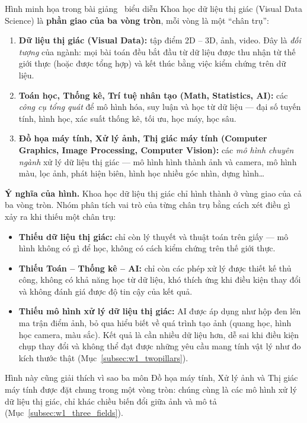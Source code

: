 Hình minh họa trong bài giảng~\citep{xlav_ai4cv} biểu diễn Khoa học dữ liệu thị giác (Visual Data Science) là \textbf{phần giao của ba vòng tròn}, mỗi vòng là một ``chân trụ'':
\begin{enumerate}
    \item \textbf{Dữ liệu thị giác (Visual Data):} tập điểm 2D -- 3D, ảnh, video. Đây là \emph{đối tượng} của ngành: mọi bài toán đều bắt đầu từ dữ liệu được thu nhận từ thế giới thực (hoặc được tổng hợp) và kết thúc bằng việc kiểm chứng trên dữ liệu.
    \item \textbf{Toán học, Thống kê, Trí tuệ nhân tạo (Math, Statistics, AI):} các \emph{công cụ tổng quát} để mô hình hóa, suy luận và học từ dữ liệu — đại số tuyến tính, hình học, xác suất thống kê, tối ưu, học máy, học sâu.
    \item \textbf{Đồ họa máy tính, Xử lý ảnh, Thị giác máy tính (Computer Graphics, Image Processing, Computer Vision):} các \emph{mô hình chuyên ngành} xử lý dữ liệu thị giác — mô hình hình thành ảnh và camera, mô hình màu, lọc ảnh, phát hiện biên, hình học nhiều góc nhìn, dựng hình\ldots
\end{enumerate}

\textbf{Ý nghĩa của hình.} Khoa học dữ liệu thị giác chỉ hình thành ở vùng giao của cả ba vòng tròn. Nhóm phân tích vai trò của từng chân trụ bằng cách xét điều gì xảy ra khi thiếu một chân trụ:
\begin{itemize}
    \item \textbf{Thiếu dữ liệu thị giác:} chỉ còn lý thuyết và thuật toán trên giấy — mô hình không có gì để học, không có cách kiểm chứng trên thế giới thực.
    \item \textbf{Thiếu Toán -- Thống kê -- AI:} chỉ còn các phép xử lý được thiết kế thủ công, không có khả năng học từ dữ liệu, khó thích ứng khi điều kiện thay đổi và không đánh giá được độ tin cậy của kết quả.
    \item \textbf{Thiếu mô hình xử lý dữ liệu thị giác:} AI được áp dụng như hộp đen lên ma trận điểm ảnh, bỏ qua hiểu biết về quá trình tạo ảnh (quang học, hình học camera, màu sắc). Kết quả là cần nhiều dữ liệu hơn, dễ sai khi điều kiện chụp thay đổi và không thể đạt được những yêu cầu mang tính vật lý như đo kích thước thật (Mục~\ref{subsec:w1_twopillars}).
\end{itemize}
Hình này cũng giải thích vì sao ba môn Đồ họa máy tính, Xử lý ảnh và Thị giác máy tính được đặt chung trong một vòng tròn: chúng cùng là các mô hình xử lý dữ liệu thị giác, chỉ khác chiều biến đổi giữa ảnh và mô tả (Mục~\ref{subsec:w1_three_fields}).

